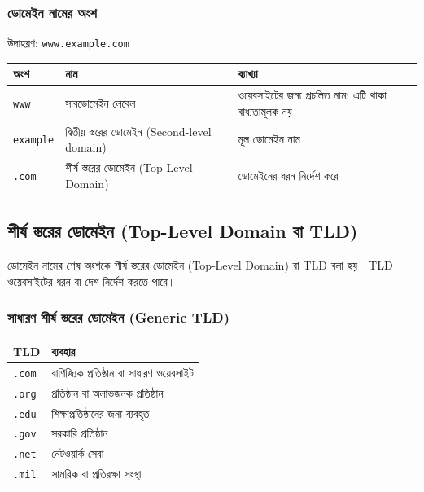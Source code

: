 \subsubsection{ডোমেইন নামের অংশ}

উদাহরণ: \texttt{www.example.com}

\begin{center}
\begin{tabular}{|p{}|p{}|p{}|}
\hline
\textbf{অংশ} & \textbf{নাম} & \textbf{ব্যাখ্যা} \\
\hline
\texttt{www} & সাবডোমেইন লেবেল & ওয়েবসাইটের জন্য প্রচলিত নাম; এটি থাকা বাধ্যতামূলক নয় \\
\hline
\texttt{example} & দ্বিতীয় স্তরের ডোমেইন (Second-level domain) & মূল ডোমেইন নাম \\
\hline
\texttt{.com} & শীর্ষ স্তরের ডোমেইন (Top-Level Domain) & ডোমেইনের ধরন নির্দেশ করে \\
\hline
\end{tabular}
\end{center}

\subsection{শীর্ষ স্তরের ডোমেইন (Top-Level Domain বা TLD)}

ডোমেইন নামের শেষ অংশকে শীর্ষ স্তরের ডোমেইন (Top-Level Domain) বা TLD বলা হয়। TLD ওয়েবসাইটের ধরন বা দেশ নির্দেশ করতে পারে।

\subsubsection{সাধারণ শীর্ষ স্তরের ডোমেইন (Generic TLD)}

\begin{center}
\begin{tabular}{|p{}|p{}|}
\hline
\textbf{TLD} & \textbf{ব্যবহার} \\
\hline
\texttt{.com} & বাণিজ্যিক প্রতিষ্ঠান বা সাধারণ ওয়েবসাইট \\
\hline
\texttt{.org} & প্রতিষ্ঠান বা অলাভজনক প্রতিষ্ঠান \\
\hline
\texttt{.edu} & শিক্ষাপ্রতিষ্ঠানের জন্য ব্যবহৃত \\
\hline
\texttt{.gov} & সরকারি প্রতিষ্ঠান \\
\hline
\texttt{.net} & নেটওয়ার্ক সেবা \\
\hline
\texttt{.mil} & সামরিক বা প্রতিরক্ষা সংস্থা \\
\hline
\end{tabular}
\end{center}

